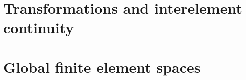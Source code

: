 \section{Transformations and interelement continuity}
\label{sec:elements:transforms}


\section{Global finite element spaces}
\label{sec:elements:global_spaces}


